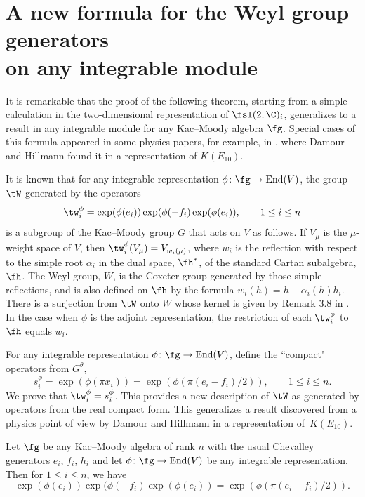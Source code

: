 \section[A new formula for the Weyl group generators on any integrable module]{A new formula for the Weyl group generators\\ on any integrable module}

It is remarkable that the proof of the following theorem, starting from a simple calculation in the two-dimensional representation of
$\fsl(2,\C)_i$, generalizes to a result in any integrable module for any Kac--Moody algebra $\fg$. Special cases of this formula appeared
in some physics papers, for example, in \cite{DamourHillmann09}, where Damour and Hillmann found it in a representation of
$K(E_{10})$.

It is known \cite{Kac90} that for any integrable representation $\phi\colon \fg\to {\rm End}(V)$, the group $\tW$ generated by the operators
\[\tw_i^\phi = \exp(\phi(e_i)) \exp(\phi(-f_i) \exp(\phi(e_i)),\qquad 1\leq i\leq n\]
is a subgroup of the Kac--Moody group $G$ that acts on $V$ as follows. If $V_\mu$ is the $\mu$-weight space of $V$, then $\tw_i^\phi (V_\mu) = V_{w_i(\mu)}$, where $w_i$ is the reflection with respect to the simple root $\alpha_i$ in the dual space, $\fh^*$, of the standard Cartan subalgebra, $\fh$. The Weyl group, $W$, is the Coxeter group generated by those simple reflections, and is also defined on $\fh$ by the formula $w_i(h) = h - \alpha_i(h) h_i$. There is a surjection from $\tW$ onto $W$ whose kernel is given by Remark 3.8 in \cite{Kac90}. In the case when $\phi$ is the adjoint representation, the restriction of each $\tw_i^\phi$ to $\fh$ equals $w_i$.

For any integrable representation $\phi\colon \fg\to {\rm End}(V)$, define the ``compact" operators from $G^\theta$,
\[s_i^\phi = \exp(\phi(\pi x_i)) = \exp(\phi(\pi(e_i - f_i)/2)),\qquad 1\leq i\leq n.\]
We prove that $\tw_i^\phi = s_i^\phi$. This provides a new description of $\tW$ as generated by operators from the real compact form. This generalizes a result discovered from a physics point of view by Damour and Hillmann in a representation of~$K(E_{10})$.

\begin{Theorem}\label{theorem:newWeylFormula} Let $\fg$ be any Kac--Moody algebra of rank $n$ with the usual Chevalley generators $e_i$, $f_i$, $h_i$ and let $\phi\colon \fg\to {\rm End}(V)$ be any integrable representation. Then for $1\leq i\leq n$, we have
\[\exp(\phi(e_i)) \exp(\phi(-f_i) \exp(\phi(e_i)) = \exp(\phi(\pi(e_i - f_i)/2)).\]
\end{Theorem}

